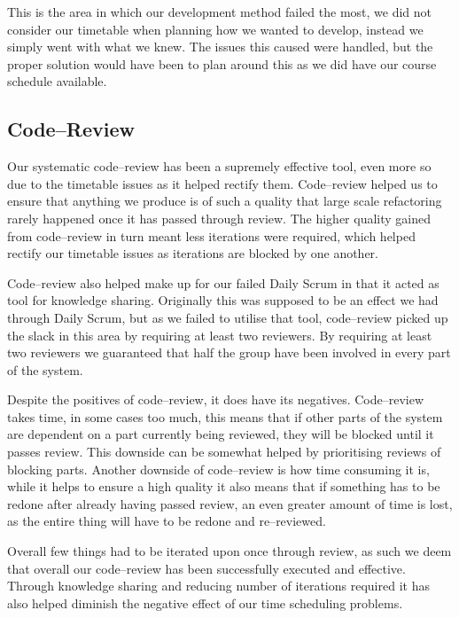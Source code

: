 This is the area in which our development method failed the most, we did not consider our timetable when planning how we wanted to develop, instead we simply went with what we knew.
The issues this caused were handled, but the proper solution would have been to plan around this as we did have our course schedule available.

\subsection{Code--Review}
Our systematic code--review has been a supremely effective tool, even more so due to the timetable issues as it helped rectify them.
Code--review helped us to ensure that anything we produce is of such a quality that large scale refactoring rarely happened once it has passed through review.
The higher quality gained from code--review in turn meant less iterations were required, which helped rectify our timetable issues as iterations are blocked by one another.

Code--review also helped make up for our failed Daily Scrum in that it acted as tool for knowledge sharing.
Originally this was supposed to be an effect we had through Daily Scrum, but as we failed to utilise that tool, code--review picked up the slack in this area by requiring at least two reviewers.
By requiring at least two reviewers we guaranteed that half the group have been involved in every part of the system.

\bigskip
Despite the positives of code--review, it does have its negatives.
Code--review takes time, in some cases too much, this means that if other parts of the system are dependent on a part currently being reviewed, they will be blocked until it passes review.
This downside can be somewhat helped by prioritising reviews of blocking parts.
Another downside of code--review is how time consuming it is, while it helps to ensure a high quality it also means that if something has to be redone after already having passed review, an even greater amount of time is lost, as the entire thing will have to be redone and re--reviewed.

Overall few things had to be iterated upon once through review, as such we deem that overall our code--review has been successfully executed and effective.
Through knowledge sharing and reducing number of iterations required it has also helped diminish the negative effect of our time scheduling problems.
